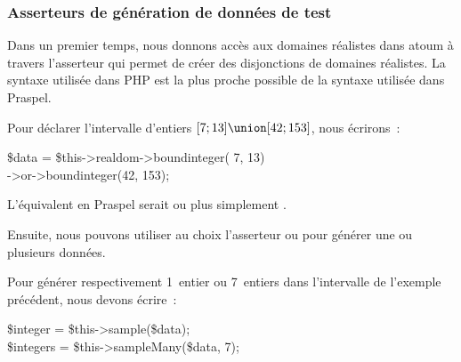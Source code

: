 \subsubsection{Asserteurs de génération de données de test}

Dans un premier temps, nous donnons accès aux domaines réalistes dans atoum à
travers l'asserteur  qui permet de créer des disjonctions de
domaines réalistes. La syntaxe utilisée dans PHP est la plus proche possible de
la syntaxe utilisée dans Praspel.

\begin{example}

Pour déclarer l'intervalle d'entiers $[7; 13] \union [42; 153]$, nous écrirons~:
%
\begin{pre}
\$data = \$this->realdom->boundinteger( 7,  13) \\
                  ->or->boundinteger(42, 153);
\end{pre}
%
L'équivalent en Praspel serait  ou plus simplement .

\end{example}

Ensuite, nous pouvons utiliser au choix l'asserteur  ou
 pour générer une ou plusieurs données.

\begin{example}

Pour générer respectivement 1~entier ou 7~entiers dans l'intervalle de l'exemple
précédent, nous devons écrire~:
%
\begin{pre}
\$integer  = \$this->sample(\$data); \\
\$integers = \$this->sampleMany(\$data, 7);
\end{pre}

\end{example}


